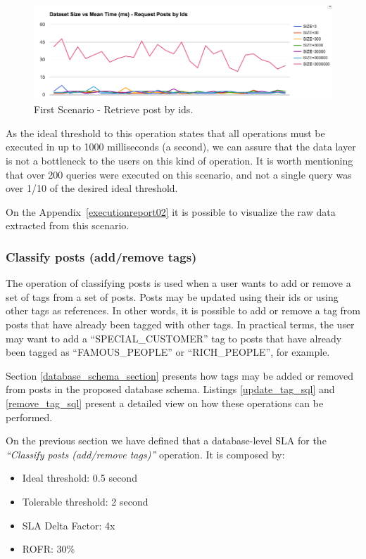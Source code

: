 \begin{figure}
\centering
\includegraphics[width=150mm]{Imagens/execution-01.png}
\caption{First Scenario - Retrieve post by ids.\label{fig:first_scenario}}
\end{figure}

As the ideal threshold to this operation states that all operations must be executed in up to 1000 milliseconds (a second), we can assure that the data layer is not a bottleneck to the users on this kind of operation. It is worth mentioning that over 200 queries were executed on this scenario, and not a single query was over 1/10 of the desired ideal threshold.

On the Appendix~\ref{executionreport02} it is possible to visualize the raw data extracted from this scenario. 

\clearpage
\subsubsection{Classify posts (add/remove tags)}

The operation of classifying posts is used when a user wants to add or remove a set of tags from a set of posts. Posts may be updated using their ids or using other tags as references. In other words, it is possible to add or remove a tag from posts that have already been tagged with other tags. In practical terms, the user may want to add a ``SPECIAL\_CUSTOMER'' tag to posts that have already been tagged as ``FAMOUS\_PEOPLE'' or ``RICH\_PEOPLE'', for example. 

Section \ref{database_schema_section} presents how tags may be added or removed from posts in the proposed database schema. Listings \ref{update_tag_sql} and \ref{remove_tag_sql} present a detailed view on how these operations can be performed. 

On the previous section we have defined that a database-level SLA for the \textit{``Classify posts (add/remove tags)''} operation. It is composed by: 

\begin{itemize}
	\item{Ideal threshold: 0.5 second}
	\item{Tolerable threshold: 2 second}
	\item{SLA Delta Factor: 4x}
	\item{ROFR: 30\%}
\end{itemize}

